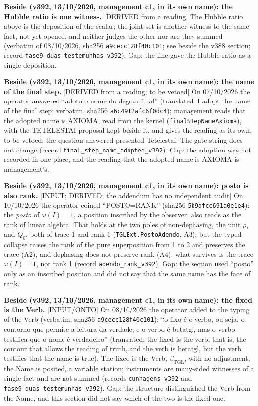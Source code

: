 \documentclass[11pt]{article}
\theoremstyle{definition}\newtheorem{deriv}{Derivation}
\begin{document}
\textbf{Beside (v392, 13/10/2026, management c1, in its own name): the Hubble ratio is one witness.} \textsf{[DERIVED from a reading]} The Hubble ratio above is the deposition of the scalar; the joint set is another witness to the same fact, not yet opened, and neither judges the other nor are they summed (verbatim of 08/10/2026, sha256 \texttt{a9cecc128f40c101}; see beside the v388 section; record \texttt{fase9\_duas\_testemunhas\_v392}). Gap: the line gave the Hubble ratio as a single deposition.

\textbf{Beside (v392, 13/10/2026, management c1, in its own name): the name of the final step.} \textsf{[DERIVED from a reading; to be vetoed]} On 07/10/2026 the operator answered ``adoto o nome do degrau final'' (translated: I adopt the name of the final step; verbatim, sha256 \texttt{a6c4912afc6f0dc4}); management reads that the adopted name is AXIOMA, read from the kernel (\texttt{finalStepNameAxioma}), with the TETELESTAI proposal kept beside it, and gives the reading as its own, to be vetoed: the question answered presented Tetelestai. The gate string does not change (record \texttt{final\_step\_name\_adopted\_v392}). Gap: the adoption was not recorded in one place, and the reading that the adopted name is AXIOMA is management's.

\textbf{Beside (v392, 13/10/2026, management c1, in its own name): posto is also rank.} \textsf{[INPUT; DERIVED; the addendum has no independent audit]} On 10/10/2026 the operator coined ``POSTO=RANK'' (sha256 \texttt{5b9afcc691a0e1e4}): the \emph{posto} of $\omega(I)=1$, a position inscribed by the observer, also reads as the rank of linear algebra. That holds at the two poles of non-dephasing, the unit $\rho_\ast$ and $Q_0$, both of trace 1 and rank 1 (\texttt{TGLExt.PostoAdendo}, A3); but the typed collapse raises the rank of the pure superposition from 1 to 2 and preserves the trace (A2), and dephasing does not preserve rank (A4): what survives is the trace $\omega(I)=1$, not rank 1 (record \texttt{adendo\_rank\_v392}). Gap: the section used ``posto'' only as an inscribed position and did not say that the same name has the face of rank.

\textbf{Beside (v392, 13/10/2026, management c1, in its own name): the fixed is the Verb.} \textsf{[INPUT/ONTO]} On 08/10/2026 the operator added to the typing of the Verb (verbatim, sha256 \texttt{a9cecc128f40c101}): ``o fixo é o verbo, ou seja, o contorno que permite a leitura da verdade, e o verbo é betatgl, mas o verbo testifica que o nome é verdadeiro'' (translated: the fixed is the verb, that is, the contour that allows the reading of truth, and the verb is betatgl, but the verb testifies that the name is true). The fixed is the Verb, $\beta_{\mathrm{TGL}}$, with no adjustment; the Name is posited, a variable station; instruments are many-sided witnesses of a single fact and are not summed (records \texttt{cunhagens\_v392} and \texttt{fase9\_duas\_testemunhas\_v392}). Gap: the structure distinguished the Verb from the Name, and this section did not say which of the two is the fixed one.
\end{document}
